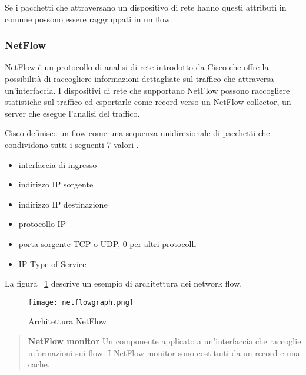 \documentclass[../main.tex]{subfiles}
\begin{document}
Se i pacchetti che attraversano un dispositivo di rete hanno questi attributi in comune possono essere raggruppati in un flow.

\subsubsection{NetFlow}
NetFlow è un protocollo di analisi di rete introdotto da Cisco che offre la possibilità di raccogliere informazioni dettagliate sul traffico che attraversa un'interfaccia. I dispositivi di rete che supportano NetFlow possono raccogliere statistiche sul traffico ed esportarle come record verso un NetFlow collector, un server che esegue l'analisi del traffico.

Cisco definisce un flow come una sequenza unidirezionale di pacchetti che condividono tutti i seguenti 7 valori \cite{netflowDef}.

\begin{itemize}
				\item interfaccia di ingresso
				\item indirizzo IP sorgente
				\item indirizzo IP destinazione
				\item protocollo IP
				\item porta sorgente TCP o UDP, 0 per altri protocolli
				\item IP Type of Service
\end{itemize}

La figura ~\ref{fig:architetturaNetflow} descrive un esempio di architettura dei network flow. 

\begin{figure}[H]
\centering
\texttt{[image: netflowgraph.png]}
\caption{Architettura NetFlow}
\label{fig:architetturaNetflow}
\end{figure}

\begin{verse}
\textbf{NetFlow monitor}
Un componente applicato a un'interfaccia che raccoglie informazioni sui flow. I NetFlow monitor sono costituiti da un record e una cache.
\end{verse}
\end{document}
